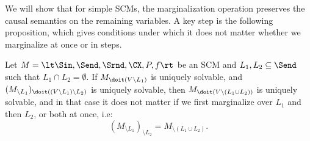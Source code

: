 We will show that for simple SCMs, the marginalization operation preserves the causal semantics on the remaining variables. 
A key step is the following proposition, which gives conditions under which it does not matter whether we marginalize at once or in steps.
\begin{Prp}\label{prp:marginalization_commutes}
  Let $M = \lt \Sin, \Send, \Srnd, \CX, P, f \rt$ be an SCM and $L_1, L_2 \subseteq \Send$ such that $L_1 \cap L_2 = \emptyset$.
  If $M_{\doit(V\setminus L_1)}$ is uniquely solvable, and
  $(M_{\setminus L_1})_{\doit((V\setminus L_1)\setminus L_2)}$ is uniquely solvable, then $M_{\doit(V\setminus(L_1\cup L_2))}$ is uniquely solvable, and in that case it does not matter if we first marginalize over $L_1$ and then $L_2$, or both at once, i.e:
  $$(M_{\setminus L_1})_{\setminus L_2} = M_{\setminus (L_1\cup L_2)}.$$
\end{Prp}
